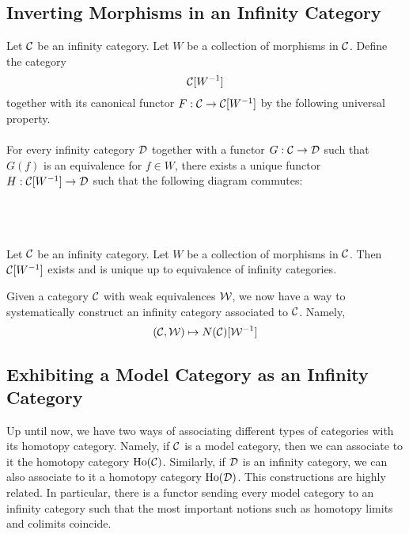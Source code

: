\documentclass[a4paper]{article}
\begin{document}
\subsection{Inverting Morphisms in an Infinity Category}
\begin{defn}{}{} Let $\mathcal{C}$ be an infinity category. Let $W$ be a collection of morphisms in $\mathcal{C}$. Define the category $$\mathcal{C}[W^{-1}]$$ together with its canonical functor $F:\mathcal{C}\to\mathcal{C}[W^{-1}]$ by the following universal property. \\~\\

For every infinity category $\mathcal{D}$ together with a functor $G:\mathcal{C}\to\mathcal{D}$ such that $G(f)$ is an equivalence for $f\in W$, there exists a unique functor $H:\mathcal{C}[W^{-1}]\to\mathcal{D}$ such that the following diagram commutes: \\~\\
\\~\\
\end{defn}

\begin{prp}{}{} Let $\mathcal{C}$ be an infinity category. Let $W$ be a collection of morphisms in $\mathcal{C}$. Then $\mathcal{C}[W^{-1}]$ exists and is unique up to equivalence of infinity categories. 
\end{prp}

Given a category $\mathcal{C}$ with weak equivalences $\mathcal{W}$, we now have a way to systematically construct an infinity category associated to $\mathcal{C}$. Namely, $$(\mathcal{C},\mathcal{W})\mapsto N(\mathcal{C})[\mathcal{W}^{-1}]$$

\subsection{Exhibiting a Model Category as an Infinity Category}
Up until now, we have two ways of associating different types of categories with its homotopy category. Namely, if $\mathcal{C}$ is a model category, then we can associate to it the homotopy category $\text{Ho}(\mathcal{C})$. Similarly, if $\mathcal{D}$ is an infinity category, we can also associate to it a homotopy category $\text{Ho}(\mathcal{D})$. This constructions are highly related. In particular, there is a functor sending every model category to an infinity category such that the most important notions such as homotopy limits and colimits coincide. \\
\end{document}
